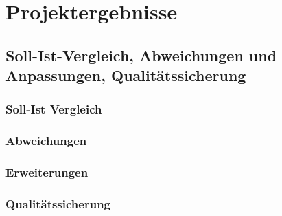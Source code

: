 \chapter{Projektergebnisse}

\section{Soll-Ist-Vergleich, Abweichungen und Anpassungen, Qualit\"atssicherung}
	\subsection{Soll-Ist Vergleich}
	\subsection{Abweichungen}
	\subsection{Erweiterungen}
	\subsection{Qualit\"atssicherung}